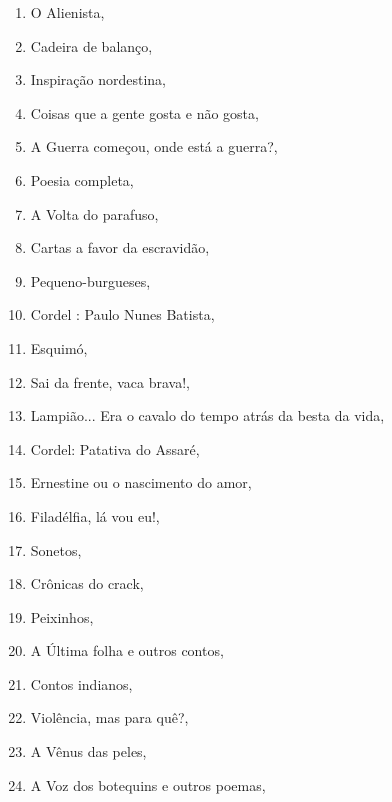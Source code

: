 \begin{multicols}{2}
\begin{enumerate}
\item O Alienista, {}
\item Cadeira de balanço, {}
\item Inspiração nordestina, {}
\item Coisas que a gente gosta e não gosta, {}
\item A Guerra começou, onde está a guerra?, {}
\item Poesia completa, {}
\item A Volta do parafuso, {}
\item Cartas a favor da escravidão, {}
\item Pequeno-burgueses, {}
\item Cordel : Paulo Nunes Batista, {}
\item Esquimó, {}
\item Sai da frente, vaca brava!, {}
\item Lampião... Era o cavalo do tempo atrás da besta da vida, {}
\item Cordel: Patativa do Assaré, {}
\item Ernestine ou o nascimento do amor, {}
\item Filadélfia, lá vou eu!, {}
\item Sonetos, {}
\item Crônicas do crack, {}
\item Peixinhos, {}
\item A Última folha e outros contos, {}
\item Contos indianos, {}
\item Violência, mas para quê?, {}
\item A Vênus das peles, {}
\item A Voz dos botequins e outros poemas, {}

\end{enumerate}
\end{multicols}
